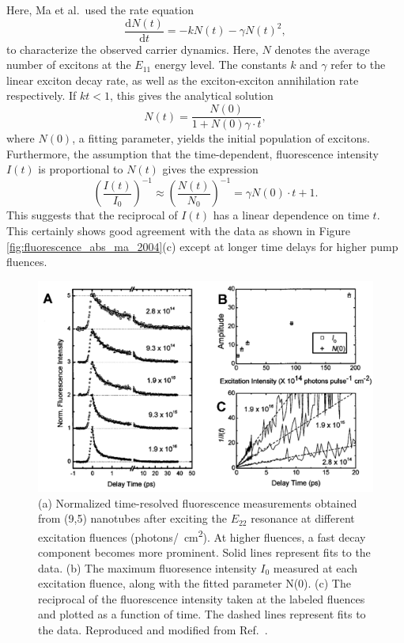 %
Here, Ma et al.\ used the rate equation
\begin{equation}
	\dfrac{\mathrm{d}N(t)}{\mathrm{d}t} = - k N(t) - \gamma N(t)^2,
\end{equation}
to characterize the observed carrier dynamics. Here, $N$ denotes the average number of excitons at the $E_{11}$ energy level. The constants $k$ and $\gamma$ refer to the linear exciton decay rate, as well as the exciton-exciton annihilation rate respectively. If $kt < 1$, this gives the analytical solution
\begin{equation}
	N(t) = \dfrac{N(0)}{1 + N(0)\gamma \cdot t},
\end{equation}
where $N(0)$, a fitting parameter, yields the initial population of excitons. Furthermore, the assumption that the time-dependent, fluorescence intensity $I(t)$ is proportional to $ N(t)$ gives the expression
\begin{equation}
  	\left( \dfrac{I(t)}{I_0} \right)^{-1} \approx \left( \dfrac{N(t)}{N_0} \right)^{-1} = \gamma N(0) \cdot t + 1.
\end{equation}
This suggests that the reciprocal of $I(t)$ has a linear dependence on time $t$. This certainly shows good agreement with the data as shown in Figure \ref{fig:fluorescence_abs_ma_2004}(c) except at longer time delays for higher pump fluences.

\begin{figure}[H]
	\centering
	\includegraphics[scale=0.35]{images/chapter_prior_works/fluorescence_2_ma_2004}
	\caption{(a) Normalized time-resolved fluorescence measurements obtained from (9,5) nanotubes after exciting the $E_{22}$ resonance at different excitation fluences (photons\si{/\cm \squared}). At higher fluences, a fast decay component becomes more prominent. Solid lines represent fits to the data. (b) The maximum fluoresence intensity $I_0$ measured at each excitation fluence, along with the fitted parameter N(0). (c) The reciprocal of the fluorescence intensity taken at the labeled fluences and plotted as a function of time. The dashed lines represent fits to the data. Reproduced and modified from Ref.\ \cite{ma2004ultrafast}.}
	\label{fig:fluorescence_ma_2004}
\end{figure}

